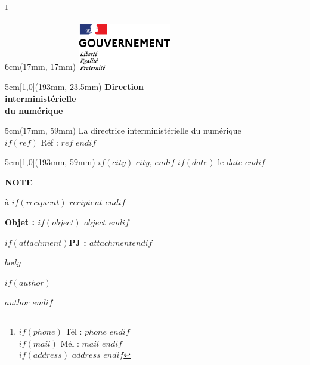 \documentclass[10pt]{article}
\begin{document}
\let\thefootnote\relax\footnote{\scriptsize\color{Gray} $if(phone)$ Tél : $phone$ $endif$ \\
    $if(mail)$ Mél : $mail$ $endif$ \\
    $if(address)$ $address$ $endif$}

\begin{textblock*}{6cm}(17mm, 17mm)
\includegraphics[height=20.5mm, trim = 27mm 25mm 30mm 29mm, clip]{Gouvernement_RVB}
\end{textblock*}


\begin{textblock*}{5cm}[1,0](193mm, 23.5mm)
\large \raggedleft	\textbf{Direction \\ interministérielle \\ du numérique}
\end{textblock*}

\begin{textblock*}{5cm}(17mm, 59mm)
La directrice interministérielle du numérique\\
$if(ref)$ \footnotesize Réf : $ref$ $endif$
\end{textblock*}


\begin{textblock*}{5cm}[1,0](193mm, 59mm)
\footnotesize \raggedleft $if(city)$ $city$, $endif$ $if(date)$ le $date$ $endif$
\end{textblock*}

\vspace*{50mm}

\begin{center}
\large\textbf{NOTE}
\end{center}

\begin{center}
\large à $if(recipient)$ $recipient$ $endif$
\end{center}

\vspace{30mm}
\textbf{Objet : $if(object)$ $object$ $endif$}

$if(attachment)$\textbf{PJ : $attachment$}$endif$
\vspace{5mm}

$body$

\bigskip

$if(author)$
\begin{flushright}
\textbf{$author$}
$endif$
\end{flushright}
\end{document}
